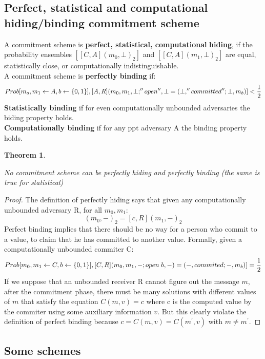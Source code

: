 \documentclass{article}
\newtheorem{thm}{Theorem}[section]
\newenvironment{theorem}{\begin{thm}\begin{rm}}%
{\end{rm}\end{thm}}
\begin{document}
\subsection{Perfect, statistical and computational hiding/binding commitment scheme}
A commitment scheme is \textbf{perfect, statistical, computational}\textbf{ hiding}, if the probability ensembles $[[C,A](m_0,\bot)_2]$ and $[[C,A](m_1,\bot)_2] $ are equal, statistically close, or computationally indistinguishable.\\

A commitment scheme is \textbf{perfectly binding} if:
\begin{equation}
Prob[m_o,m_1 \leftarrow A, b \leftarrow \{0,1\}], [A,R](m_0,m_1,\bot;''open'',\bot = (\bot,''committed'';\bot,m_b)] < {1 \over 2}
\end{equation} 
\textbf{Statistically binding} if for even computationally unbounded adversaries the biding property holds.\\
\textbf{Computationally binding} if for any ppt adversary A the binding property holds.

\begin{theorem}
No commitment scheme can be perfectly hiding and perfectly binding (the same is true for statistical)
\end{theorem}
\begin{proof}
The definition of perfectly hiding says that given any computationally unbounded adversary R, for all $m_0,m_1$:
\begin{equation}
[c,R](m_0,-)_2 = [c,R](m_1,-)_2
\end{equation} 
Perfect binding implies that there should be no way for a person who commit to a value, to claim that he has committed to another value. Formally, given a computationally unbounded commiter C:
\begin{equation}
Prob[m_0,m_1 \leftarrow C, b \leftarrow \{0,1\}], [C,R] (m_0,m_1, -;open\;b,-) = (-,commited;-,m_b)] = {1 \over 2}
\end{equation}
If we suppose that an unbounded receiver R cannot figure out the message $m$, after the commitment phase, there must be many solutions with different values of $m$ that satisfy the equation $C(m,v) = c$ where c is the computed value by the commiter using some auxiliary information $v$. But this clearly violate the definition of perfect binding because $c = C(m,v) = C(m^{'},v)$ with $m \neq m^{'}$.
\end{proof}

\subsection{Some schemes}
\end{document}
